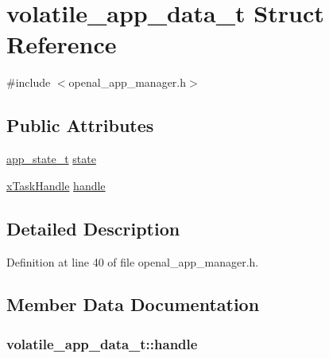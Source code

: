 \hypertarget{structvolatile__app__data__t}{}\section{volatile\+\_\+app\+\_\+data\+\_\+t Struct Reference}
\label{structvolatile__app__data__t}


{\ttfamily \#include $<$openal\+\_\+app\+\_\+manager.\+h$>$}

\subsection*{Public Attributes}
\begin{DoxyCompactItemize}
\item 
\hyperlink{agilefox_200std__low__power__mode_200std__low__power__mode_8c_a5bb27460721cc90620d197fabf50d4bb}{app\+\_\+state\+\_\+t} \hyperlink{structvolatile__app__data__t_aa582a0d6fc824f28b008deca5a184bf7}{state}
\item 
\hyperlink{_free_r_t_o_s_8h_af7cd8f53b62f0c497b442b504c30f2ec}{x\+Task\+Handle} \hyperlink{structvolatile__app__data__t_ab76e8eeb4b04bab9f0db84c2883be0af}{handle}
\end{DoxyCompactItemize}


\subsection{Detailed Description}


Definition at line 40 of file openal\+\_\+app\+\_\+manager.\+h.



\subsection{Member Data Documentation}
\subsubsection[{\texorpdfstring{handle}{handle}}]{ volatile\+\_\+app\+\_\+data\+\_\+t\+::handle}\hypertarget{structvolatile__app__data__t_ab76e8eeb4b04bab9f0db84c2883be0af}{}\label{structvolatile__app__data__t_ab76e8eeb4b04bab9f0db84c2883be0af}



